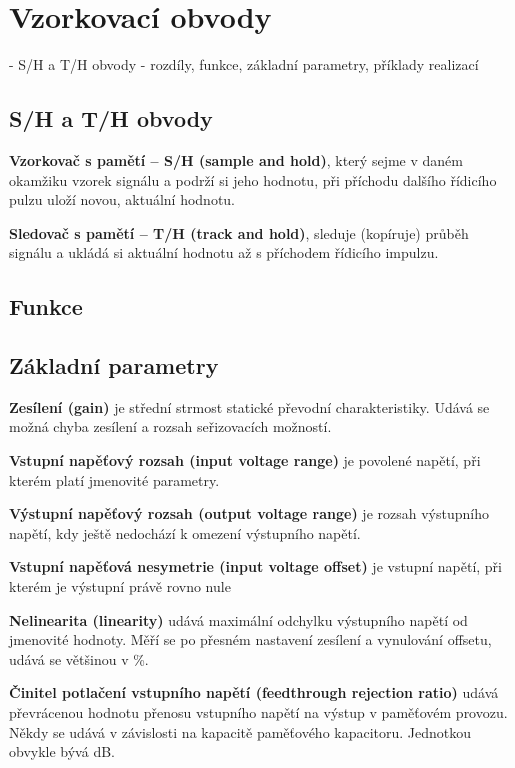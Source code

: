 \section{Vzorkovací obvody}
- S/H a T/H obvody - rozdíly, funkce, základní parametry, příklady realizací
\subsection{S/H a T/H obvody}
\textbf{Vzorkovač s pamětí – S/H (sample and hold)}, který sejme v daném okamžiku vzorek signálu a podrží si jeho hodnotu, při příchodu dalšího řídicího pulzu uloží novou, aktuální hodnotu.

\textbf{Sledovač s pamětí – T/H (track and hold)}, sleduje (kopíruje) průběh signálu a ukládá si aktuální hodnotu až s příchodem řídicího impulzu.

\subsection{Funkce}

\subsection{Základní parametry}
\textbf{Zesílení (gain)} je střední strmost statické převodní charakteristiky. Udává se možná
chyba zesílení a rozsah seřizovacích možností.

\textbf{Vstupní napěťový rozsah (input voltage range)} je povolené napětí, při kterém platí
jmenovité parametry.

\textbf{Výstupní napěťový rozsah (output voltage range)} je rozsah výstupního napětí, kdy ještě
nedochází k omezení výstupního napětí.

\textbf{Vstupní napěťová nesymetrie (input voltage offset)} je vstupní napětí, při kterém je
výstupní právě rovno nule

\textbf{Nelinearita (linearity)} udává maximální odchylku výstupního napětí od jmenovité hodnoty. Měří se po přesném nastavení zesílení a vynulování offsetu, udává se většinou v \%.

\textbf{Činitel potlačení vstupního napětí (feedthrough rejection ratio)} udává převrácenou
hodnotu přenosu vstupního napětí na výstup v paměťovém provozu. Někdy se udává
v závislosti na kapacitě paměťového kapacitoru. Jednotkou obvykle bývá dB.

